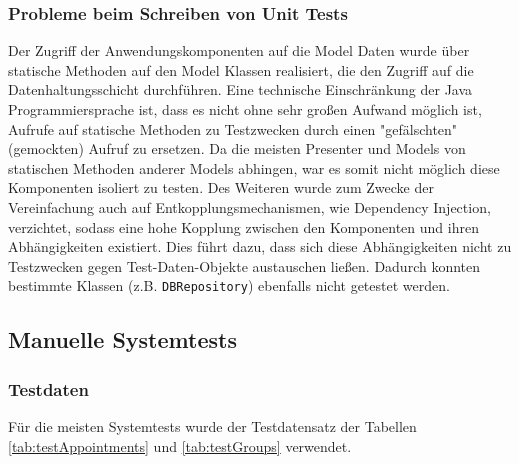 \subsubsection{Probleme beim Schreiben von Unit Tests}
Der Zugriff der Anwendungskomponenten auf die Model Daten wurde über statische Methoden auf den Model Klassen realisiert, die den Zugriff auf die Datenhaltungsschicht durchführen. Eine technische Einschränkung der Java Programmiersprache ist, dass es nicht ohne sehr großen Aufwand möglich ist, Aufrufe auf statische Methoden zu Testzwecken durch einen "gefälschten" (gemockten) Aufruf zu ersetzen. Da die meisten Presenter und Models von statischen Methoden anderer Models abhingen, war es somit nicht möglich diese Komponenten isoliert zu testen. Des Weiteren wurde zum Zwecke der Vereinfachung auch auf Entkopplungsmechanismen, wie Dependency Injection, verzichtet, sodass eine hohe Kopplung zwischen den Komponenten und ihren Abhängigkeiten existiert. Dies führt dazu, dass sich diese Abhängigkeiten nicht zu Testzwecken gegen Test-Daten-Objekte austauschen ließen. Dadurch konnten bestimmte Klassen (z.B. \texttt{DBRepository}) ebenfalls nicht getestet werden.

\subsection{Manuelle Systemtests}
\subsubsection{Testdaten}
Für die meisten Systemtests wurde der Testdatensatz der Tabellen \ref{tab:testAppointments} und \ref{tab:testGroups} verwendet.


